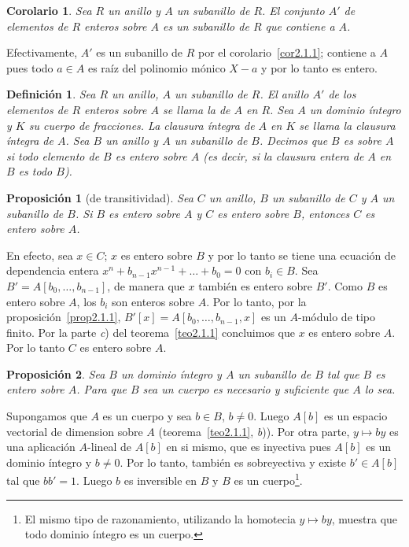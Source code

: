 \documentclass[bibtotoc,leqno,spanish]{amsbook}
\let\emph\relax %
\numberwithin{equation}{section}
\theoremstyle{note}
\newtheorem{definition}{Definici\'on}
\theoremstyle{note}
\newtheorem{proposition}{Proposici\'on}
\newtheorem{corollary}{Corolario}
\theoremstyle{rem}
\numberwithin{theorem}{section}
\numberwithin{proposition}{section}
\numberwithin{definition}{section}
\numberwithin{lemma}{section}
\numberwithin{corollary}{section}
\numberwithin{example}{section}
\numberwithin{footnote}{section}%
\begin{document}
\begin{corollary}\label{cor2.1.2}
Sea $R$ un anillo y $A$ un subanillo de $R$. El conjunto $A'$ de elementos de $R$ enteros sobre $A$
es un subanillo de $R$ que contiene a $A$.
\end{corollary}

Efectivamente, $A'$ es un subanillo de $R$ por el corolario~\ref{cor2.1.1}; contiene a $A$ pues todo $a\in A$ es
ra\'iz del polinomio m\'onico $X-a$ y por lo tanto es entero.

\begin{definition}
Sea $R$ un anillo, $A$ un subanillo de $R$. El anillo $A'$ de los elementos de $R$ enteros sobre $A$ se
llama la \emph{clausura \'integra} de $A$ en $R$. Sea $A$ un dominio \'integro y $K$ su cuerpo de fracciones. La clausura
\'integra de $A$ en $K$ se llama la clausura \'integra de $A$.
Sea $B$ un anillo y $A$ un subanillo de $B$. Decimos
que $B$ es \emph{entero} sobre $A$ si todo elemento de $B$ es entero sobre $A$ (es decir, si la clausura
entera de $A$ en $B$ es todo $B$).
\end{definition}

\begin{proposition}[de transitividad]\label{prop2.1.2}
Sea $C$ un anillo, $B$ un subanillo de $C$ y $A$ un subanillo de $B$. Si $B$ es entero sobre $A$ y $C$ es
entero sobre $B$, entonces $C$ es entero sobre $A$.
\end{proposition}

En efecto, sea $x\in C$; $x$ es entero sobre $B$ y por lo tanto se tiene una ecuaci\'on de dependencia entera
$x^{n}+b_{n-1}x^{n-1}+\dots+b_{0} = 0$ con $b_{i}\in B$. Sea $B' = A[b_{0},\dots,b_{n-1}]$, de manera que $x$
tambi\'en es entero sobre $B'$. Como $B$ es entero sobre $A$, los $b_{i}$ son enteros sobre
$A$. Por lo tanto, por la proposici\'on~\ref{prop2.1.1},
$B'[x] = A[b_{0},\dots,b_{n-1},x]$ es un $A$-m\'odulo de tipo finito. Por la parte
{\itshape c}) del teorema~\ref{teo2.1.1}
concluimos que $x$ es entero sobre $A$. Por lo tanto $C$ es entero sobre $A$.

\begin{proposition}\label{prop2.1.3}
Sea $B$ un dominio \'integro y $A$ un subanillo de $B$ tal que $B$ es entero sobre $A$. Para que $B$ sea
un cuerpo es necesario y suficiente que $A$ lo sea.
\end{proposition}

Supongamos que $A$ es un cuerpo y sea $b\in B$, $b\neq 0$. Luego $A[b]$ es un espacio vectorial de
dimension \emph{finita} sobre $A$ (teorema~\ref{teo2.1.1}, {\itshape b})).
Por otra parte, $y\mapsto by$ es una aplicaci\'on
$A$-lineal de $A[b]$ en si mismo, que es inyectiva pues $A[b]$ es un dominio \'integro y $b\neq 0$. Por
lo tanto, tambi\'en es sobreyectiva y existe $b'\in A[b]$ tal que $bb' =1$. Luego $b$ es inversible en $B$
y $B$ es un cuerpo\footnote{El mismo tipo de razonamiento, utilizando la homotecia $y\mapsto by$, muestra
que todo dominio \'integro \emph{finito} es un cuerpo.}.
\end{document}
